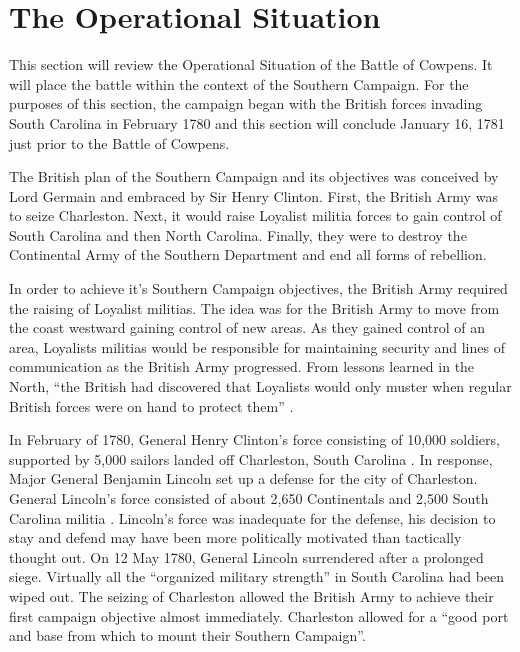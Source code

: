 \section{The Operational Situation}

This section will review the Operational Situation of the Battle of Cowpens.
It will place the battle within the context of the Southern Campaign.   For the
purposes of this section, the campaign began with the British forces invading
South Carolina in February 1780 and this section will conclude January 16, 1781
just prior to the Battle of Cowpens.

The British plan of the Southern Campaign and its objectives was conceived by
Lord Germain and embraced by Sir Henry Clinton.  First, the British Army was to
seize Charleston.  Next, it would raise Loyalist militia forces to gain control
of South Carolina and then North Carolina.  Finally, they were to destroy the
Continental Army of the Southern Department and end all forms of rebellion.

In order to achieve it's Southern Campaign objectives, the British Army
required the raising of Loyalist militias.  The idea was for the British Army
to move from the coast westward gaining control of new areas.  As they gained
control of an area, Loyalists militias would be responsible for maintaining
security and lines of communication as the British Army progressed.  From
lessons learned in the North, ``the British had discovered that Loyalists would
only muster when regular British forces were on hand to protect them''
\cite[43]{woodward_comparative_2002}.

In February of 1780, General Henry Clinton's force consisting of 10,000
soldiers, supported by 5,000 sailors landed off Charleston, South Carolina
\cite[6]{weigley_partisan_1970}.   In response, Major General Benjamin Lincoln set up a defense for
the city of Charleston. General Lincoln's force consisted of about 2,650
Continentals and 2,500 South Carolina militia \cite[6]{weigley_partisan_1970}.  Lincoln's force was
inadequate for the defense, his decision to stay and defend may have been more
politically motivated than tactically thought out.  On 12 May 1780, General
Lincoln surrendered after a prolonged siege.   Virtually all the ``organized
military strength'' in South Carolina had been wiped out.  The seizing of
Charleston allowed the British Army to achieve their first campaign objective
almost immediately.  Charleston allowed for a ``good port and base from which
to mount their Southern Campaign''. \cite[22]{woodward_comparative_2002}

